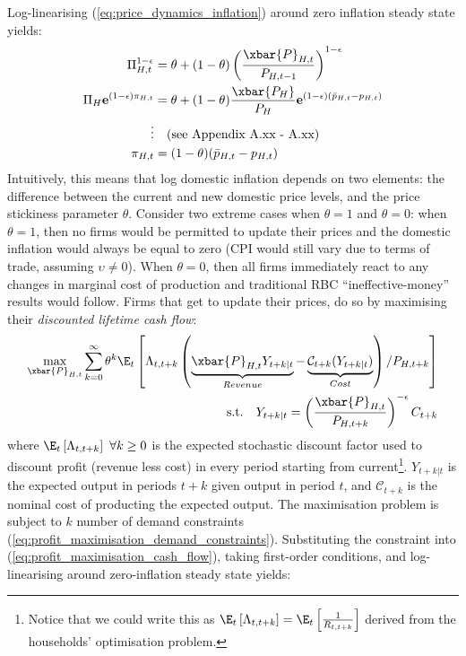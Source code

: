 Log-linearising (\ref{eq:price_dynamics_inflation}) around zero inflation steady state yields:
\begin{align}
    \Pi_{H,t}^{1-\epsilon} &= \theta + (1-\theta)\left(\frac{\xbar{P}_{H,t}}{P_{H,t-1}}\right)^{1-\epsilon} \\
    \Pi_H \mathbf{e}^{(1-\epsilon)\pi_{H,t}} &= \theta + (1-\theta)\frac{\xbar{P_H}}{P_H}\mathbf{e}^{(1-\epsilon)(\bar{p}_{H,t} - p_{H,t})} \\
    \vdots & \quad \text{(see Appendix A.xx - A.xx)} \\
    \pi_{H,t} &= (1-\theta)(\bar{p}_{H,t} - p_{H,t}) \label{eq:domestic_inflation_new_price_relationship}
\end{align}
Intuitively, this means that log domestic inflation depends on two elements: the difference between the current and new domestic price levels, and the price stickiness parameter $\theta$. Consider two extreme cases when $\theta = 1$ and $\theta = 0$: when $\theta = 1$, then no firms would be permitted to update their prices and the domestic inflation would always be equal to zero (CPI would still vary due to terms of trade, assuming $\upsilon \ne 0$). When $\theta = 0$, then all firms immediately react to any changes in marginal cost of production and traditional RBC ``ineffective-money'' results would follow. Firms that get to update their prices, do so by maximising their \textit{discounted lifetime cash flow}:
\begin{align}
    \max_{\xbar{P}_{H,t}} \sum_{k=0}^{\infty} \theta^k \E_t \left[\Lambda_{t,t+k} \left( \underbrace{\xbar{P}_{H,t} Y_{t+k|t}}_{Revenue} - \underbrace{\mathcal{C}_{t+k}(Y_{t+k|t})}_{Cost} \right) / P_{H,t+k} \right] \label{eq:profit_maximisation_cash_flow}\\
    \text{s.t.} \quad Y_{t+k|t} = \left(\frac{\xbar{P}_{H,t}}{P_{H,t+k}}\right)^{-\epsilon} C_{t+k} \label{eq:profit_maximisation_demand_constraints}
\end{align}
where $\E_t \left[\Lambda_{t,t+k}\right]\ \forall k \geq 0$ is the expected stochastic discount factor used to discount profit (revenue less cost) in every period starting from current\footnote{Notice that we could write this as $\E_t \left[\Lambda_{t,t+k}\right]=\E_t \left[\frac{1}{R_{t, t+k}}\right]$ derived from the households' optimisation problem.}. $Y_{t+k|t}$ is the expected output in periods $t+k$ given output in period $t$, and $\mathcal{C}_{t+k}$ is the nominal cost of producting the expected output. The maximisation problem is subject to $k$ number of demand constraints (\ref{eq:profit_maximisation_demand_constraints}). Substituting the constraint into (\ref{eq:profit_maximisation_cash_flow}), taking first-order conditions, and log-linearising around zero-inflation steady state yields:
